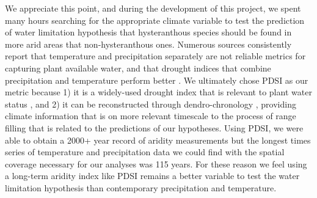 \documentclass{article}[12pt]
\begin{document}
We appreciate this point, and during the development of this project, we spent many hours searching for the appropriate climate variable to test the prediction of water limitation hypothesis that hysteranthous species should be found in more arid areas that non-hysteranthous ones. Numerous sources consistently report that temperature and precipitation separately are not reliable metrics for capturing plant available water, and that drought indices that combine precipitation and temperature perform better \citep{Moles_2014,Piedallu_2013,Hickler_2009}. We ultimately chose PDSI as our metric because 1) it is a widely-used drought index that is relevant to plant water status \citep{Dai:2004aa,MIKA2005223}, and 2) it can be reconstructed through dendro-chronology \citep{Cook_2010}, providing climate information that is on more relevant timescale to the process of range filling that is related to the predictions of our hypotheses. Using PDSI, we were able to obtain a 2000+ year record of aridity measurements but the longest times series of temperature and precipitation data we could find with the spatial coverage necessary for our analyses was 115 years. %
For these reason we feel using a long-term aridity index like PDSI remains a better variable to test the water limitation hypothesis than contemporary precipitation and temperature. 



\end{document}
